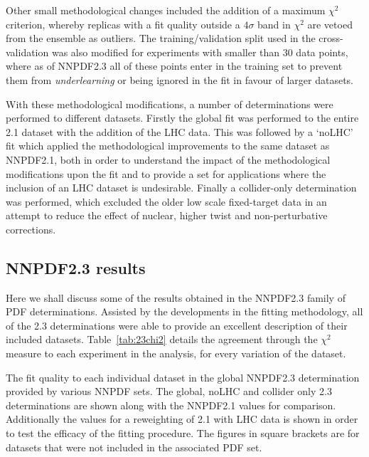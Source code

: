 Other small methodological changes included the addition of a maximum $\chi^2$ criterion, whereby replicas with a fit quality outside a $4\sigma$ band in $\chi^2$ are vetoed from the ensemble as outliers. The training/validation split used in the cross-validation was also modified for experiments with smaller than 30 data points, where as of NNPDF2.3 all of these points enter in the training set to prevent them from \emph{underlearning} or being ignored in the fit in favour of larger datasets.



With these methodological modifications, a number of determinations were performed to different datasets. Firstly the global fit was performed to the entire 2.1 dataset with the addition of the LHC data. This was followed by a `noLHC' fit which applied the methodological improvements to the same dataset as NNPDF2.1, both in order to understand the impact of the methodological modifications upon the fit and to provide a set for applications where the inclusion of an LHC dataset is undesirable. Finally a collider-only determination was performed, which excluded the older low scale fixed-target data in an attempt to reduce the effect of nuclear, higher twist and non-perturbative corrections. 


\subsection{NNPDF2.3 results}

Here we shall discuss some of the results obtained in the NNPDF2.3 family of PDF determinations. Assisted by the developments in the fitting methodology, all of the 2.3 determinations were able to provide an excellent description of their included datasets. Table~\ref{tab:23chi2} details the agreement through the $\chi^2$ measure to each experiment in the analysis, for every variation of the dataset.


\begin{table}[hp]

\caption[Fit quality in the NNPDF2.3 family of PDF determinations]{\small \label{tab:estfit2dataset}  The fit quality to each individual dataset in the global NNPDF2.3 determination provided by various NNPDF sets. The global, noLHC and collider only 2.3 determinations are shown along with the NNPDF2.1 values for comparison. Additionally the values for a reweighting of 2.1 with LHC data is shown in order to test the efficacy of the fitting procedure. The figures in square brackets are for datasets that were not included in the associated PDF set. }
\label{tab:23chi2}
\end{table}

